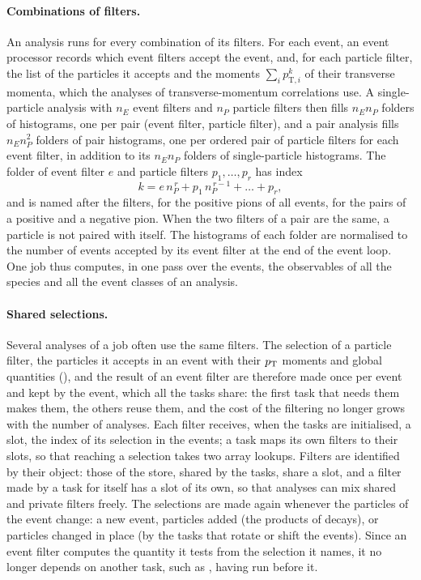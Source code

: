 \paragraph{Combinations of filters.}
An analysis runs for every combination of its filters. For each event, an event processor records which event filters
accept the event, and, for each particle filter, the list of the particles it accepts and the moments
$\sum_i p_{\mathrm{T},i}^k$ of their transverse momenta, which the analyses of transverse-momentum correlations use.
A single-particle analysis with $n_E$ event filters and $n_P$ particle filters then fills $n_E n_P$ folders of
histograms, one per pair (event filter, particle filter), and a pair analysis fills $n_E n_P^2$ folders of pair
histograms, one per ordered pair of particle filters for each event filter, in addition to its $n_E n_P$ folders of
single-particle histograms. The folder of event filter $e$ and particle filters $p_1, \dots, p_r$ has index
\begin{equation}
  k = e\, n_P^{\,r} + p_1\, n_P^{\,r-1} + \dots + p_r ,
\end{equation}
and is named after the filters,  for the positive pions of all events,  for the pairs of a
positive and a negative pion. When the two filters of a pair are the same, a particle is not paired with itself. The
histograms of each folder are normalised to the number of events accepted by its event filter at the end of the event
loop. One job thus computes, in one pass over the events, the observables of all the species and all the event classes of
an analysis.

\paragraph{Shared selections.}
Several analyses of a job often use the same filters. The selection of a particle filter, the particles it accepts in
an event with their $p_{\mathrm{T}}$ moments and global quantities (), and the result of an event filter
are therefore made once per event and kept by the event, which all the tasks share: the first task that needs them
makes them, the others reuse them, and the cost of the filtering no longer grows with the number of analyses. Each
filter receives, when the tasks are initialised, a slot, the index of its selection in the events; a task maps its own
filters to their slots, so that reaching a selection takes two array lookups. Filters are identified by their object:
those of the store, shared by the tasks, share a slot, and a filter made by a task for itself has a slot of its own, so
that analyses can mix shared and private filters freely. The selections are made again whenever the particles of the
event change: a new event, particles added (the products of decays), or particles changed in place (by the tasks that
rotate or shift the events). Since an event filter computes the quantity it tests from the selection it names, it no
longer depends on another task, such as , having run before it.

